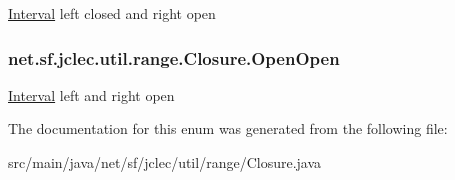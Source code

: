\hyperlink{classnet_1_1sf_1_1jclec_1_1util_1_1range_1_1_interval}{Interval} left closed and right open \hypertarget{enumnet_1_1sf_1_1jclec_1_1util_1_1range_1_1_closure_a01aaf87015e4908454cd585add76fef1}{
\subsubsection[{Open\-Open}]{\setlength{\rightskip}{0pt plus 5cm}net.\-sf.\-jclec.\-util.\-range.\-Closure.\-Open\-Open}}\label{enumnet_1_1sf_1_1jclec_1_1util_1_1range_1_1_closure_a01aaf87015e4908454cd585add76fef1}
\hyperlink{classnet_1_1sf_1_1jclec_1_1util_1_1range_1_1_interval}{Interval} left and right open 

The documentation for this enum was generated from the following file\-:\begin{DoxyCompactItemize}
\item 
src/main/java/net/sf/jclec/util/range/Closure.\-java\end{DoxyCompactItemize}
